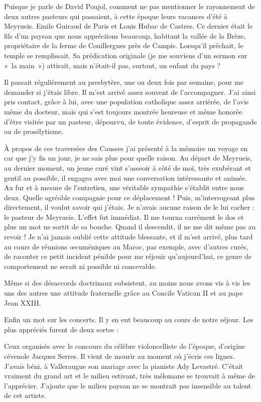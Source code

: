 Puisque je parle de David Poujol, comment ne pas mentionner le rayonnement de
deux autres pasteurs qui passaient, à cette époque leurs vacances d’été à Meyrueis.
Emile Guiraud de Paris et Louis Hubac de Castres. Ce dernier était le fils d’un paysan
que nous appréciions beaucoup, habitant la vallée de la Brèze, propriétaire de la
ferme de Conillergues près de Campis. Lorsqu’il prêchait, le temple se remplissait.
Sa prédication originale (je me souviens d’un sermon sur «~la main~») attirait, mais
n’était-il pas, surtout, un enfant du pays ?

Il passait régulièrement au presbytère, une ou deux fois par semaine, pour me
demander si j’étais libre. Il m’est arrivé assez souvent de l’accompagner. J’ai ainsi
pris contact, grâce à lui, avec une population catholique assez arriérée, de l’avis
même du docteur, mais qui s’est toujours montrée heureuse et même honorée d’être
visitée par un pasteur, dépourvu, de toute évidence, d’esprit de propagande ou de
prosélytisme.

À propos de ces traversées des Causses j’ai présenté à la mémoire un voyage en car
que j’y fis un jour, je ne sais plus pour quelle raison. Au départ de Meyrueis, au
dernier moment, un jeune curé vint s’asseoir à côté de moi, très exubérant et gentil
au possible, il engagea avec moi une conversation intéressante et animée. Au fur et à
mesure de l’entretien, une véritable sympathie s’établit entre nous deux. Quelle
agréable compagnie pour ce déplacement ! Puis, m’interrogeant plus directement, il
voulut savoir qui j’étais. Je n’avais aucune raison de le lui cacher : le pasteur de
Meyrueis. L’effet fut immédiat. Il me tourna carrément le dos et plus un mot ne sortit
de sa bouche. Quand il descendit, il ne me dit même pas au revoir !
Je n’ai jamais oublié cette attitude blessante, et il m’est arrivé, plus tard au cours de
réunions œcuméniques au Maroc, par exemple, avec d’autres curés, de raconter ce
petit incident pénible pour me réjouir qu’aujourd’hui, ce genre de comportement ne
serait ni possible ni concevable.

Même si des désaccords doctrinaux subsistent, au moins nous avons vis à vis les uns
des autres une attitude fraternelle grâce au Concile Vatican II et au pape Jean XXIII.

Enfin un mot sur les concerts. Il y en eut beaucoup au cours de notre séjour. Les plus
appréciés furent de deux sortes :

Ceux organisés avec le concours du célèbre violoncelliste de l’époque, d’origine
cévenole Jacques Serres. Il vient de mourir au moment où j’écris ces lignes. J’avais
béni, à Valleraugue son mariage avec la pianiste Ady Levastré. C’était vraiment du
grand art et le milieu estivant, très mélomane se trouvait à même de l’apprécier.
J’ajoute que le milieu paysan ne se montrait pas insensible au talent de cet artiste.

